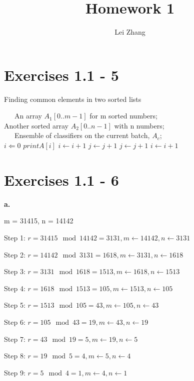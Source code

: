\documentclass{article}
\title{Homework 1}
\author{Lei Zhang}
\begin{document}
\maketitle

\section{Exercises 1.1 - 5}

\begin{algorithm}
\caption{Finding common elements in two sorted lists}
\begin{algorithmic}[1]
\REQUIRE ~~\
An array $A_1[0..m-1]$ for m sorted numbers;\\
Another sorted array $A_2[0..n-1]$ with n numbers;\\
\ENSURE ~~\
Ensemble of classifiers on the current batch, $A_c$; \\
\STATE $ i \Leftarrow 0 $
\WHILE {$ (i < m) and (j < n) $}
\STATE $print A[i]$
\STATE $i \leftarrow i + 1$
\STATE $j \leftarrow j + 1$
\STATE $j \leftarrow j + 1$
\ELSE
\STATE $i \leftarrow i +1$
\ENDIF
\ENDWHILE
\end{algorithmic}
\end{algorithm}

\section{Exercises 1.1 - 6}

\textbf{a.}

m = 31415, n = 14142

Step 1: $r = 31415 \mod 14142 = 3131, m \leftarrow 14142, n \leftarrow 3131 $

Step 2: $r = 14142 \mod 3131 = 1618, m \leftarrow 3131, n \leftarrow 1618 $

Step 3: $r = 3131 \mod 1618 = 1513, m \leftarrow 1618, n \leftarrow 1513 $

Step 4: $r = 1618 \mod 1513 = 105, m \leftarrow 1513, n \leftarrow 105 $

Step 5: $r = 1513 \mod 10 5= 43, m \leftarrow 105, n \leftarrow 43 $

Step 6: $r = 105 \mod 43 = 19, m \leftarrow 43, n \leftarrow 19 $

Step 7: $r = 43 \mod 19 = 5, m \leftarrow 19, n \leftarrow 5 $

Step 8: $r = 19 \mod 5 = 4, m \leftarrow 5, n \leftarrow 4 $

Step 9: $r = 5 \mod 4 = 1, m \leftarrow 4, n \leftarrow 1 $
\end{document}
